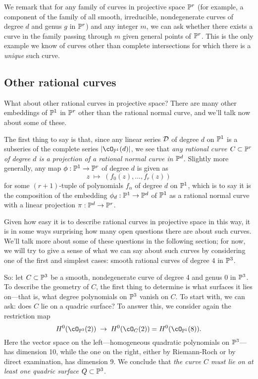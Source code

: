 We remark that for any family of curves in projective space $\PP^r$ (for example, a component of the family of all smooth, irreducible, nondegenerate curves of degree $d$ and genus $g$ in $\PP^r$) and any integer $m$, we can ask whether there exists a curve in the family passing through $m$ given general points of $\PP^r$. This is the only example we know of curves other than complete intersections for which there is a \emph{unique} such curve.


\subsection{Other rational curves}

What about other rational curves in projective space? There are many other embeddings of $\PP^1$ in $\PP^r$ other than the rational normal curve, and we'll talk now about some of these.

The first thing to say is that, since any linear series $\cD$ of degree $d$ on $\PP^1$ is a subseries of the complete series $|\cO_{\PP^1}(d)|$, we see that \emph{any rational curve $C \subset \PP^r$ of degree $d$ is a projection of a rational normal curve in $\PP^d$}. Slightly more generally, any map $\phi : \PP^1 \to \PP^r$ of degree $d$ is given as
$$
z \; \mapsto \; (f_0(z), \dots, f_r(z))
$$
for some $(r+1)$-tuple of polynomials $f_\alpha$ of degree $d$ on $\PP^1$, which is to say it is the composition of the embedding $\phi_d : \PP^1 \to \PP^d$ of $\PP^1$ as a rational normal curve with a linear projection $\pi : \PP^d \to \PP^r$. 

Given how easy it is to describe rational curves in projective space in this way, it is in some ways surprising how many open questions there are about such curves. We'll talk more about some of these questions in the following section; for now, we will try to give a sense of what we can say about such curves by considering one of the first and simplest cases: smooth rational curves of degree $4$ in $\PP^3$.

So: let $C \subset \PP^3$ be a smooth, nondegenerate curve of degree 4 and genus 0 in $\PP^3$. To describe the geometry of $C$, the first thing to determine is what surfaces it lies on---that is, what degree polynomials on $\PP^3$ vanish on $C$. 
To start with, we can ask: does $C$ lie on a quadric surface? To answer this, we consider again the restriction map
$$
H^0(\cO_{\PP^3}(2)) \; \to \; H^0(\cO_{C}(2)) = H^0(\cO_{\PP^1}(8)).
$$
Here the vector space on the left---homogeneous quadratic polynomials on $\PP^3$---has dimension 10, while the one on the right, either by Riemann-Roch or by direct examination, has dimension 9. We conclude that \emph{the curve $C$ must lie on at least one quadric surface $Q \subset \PP^3$}.

